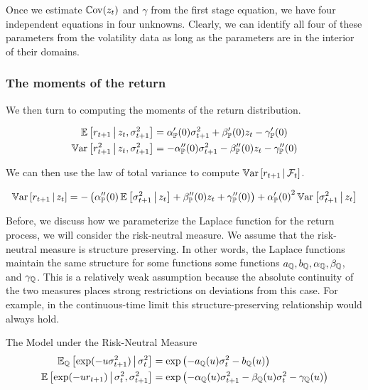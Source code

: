 \documentclass[11pt, letterpaper, twoside, final]{article}
\begin{document}
Once we estimate $\operatorname{\mathbb{C}ov} (z_t)$ and $\gamma$ from the first stage equation, we have four independent equations in
four unknowns.
Clearly, we can identify all four of these parameters from the volatility data as long as the parameters are in
the interior of their domains.

\subsubsection{The moments of the return}

We then turn to computing the moments of the return distribution. 

\begin{align}
    \operatorname{\mathbb{E}}\left[r_{t+1} \,\middle\vert\, z_t, \sigma^2_{t+1}\right]  &= \alpha_{\mathbb{P}}'(0) \sigma^2_{t+1}  + \beta_{\mathbb{P}}'(0)
    z_t - \gamma_{\mathbb{P}}'(0) \\
    \operatorname{\mathbb{V}ar}\left[r_{t+1}^2 \,\middle\vert\, z_t, \sigma^2_{t+1}\right]  &= -\alpha_{\mathbb{P}}''(0) \sigma^2_{t+1}  -
    \beta_{\mathbb{P}}''(0) z_t - \gamma_{\mathbb{P}}''(0)
\end{align}

We can then use the law of total variance to compute $\operatorname{\mathbb{V}ar}\left[r_{t+1} \,\middle\vert\, \mathcal{F}_t\right]$.

\begin{equation}
    \operatorname{\mathbb{V}ar}\left[r_{t+1} \,\middle\vert\, z_t\right]  = -\left( \alpha_{\mathbb{P}}''(0) \operatorname{\mathbb{E}} \left[\sigma^2_{t+1} \,\middle\vert\, z_t \right]
    + \beta_{\mathbb{P}}''(0) z_t + \gamma_{\mathbb{P}}''(0)\right) + {\alpha_{\mathbb{P}}'(0)}^2 \operatorname{\mathbb{V}ar}\left[\sigma^2_{t+1}
    \,\middle\vert\, z_{t} \right]
\end{equation}

Before, we discuss how we parameterize the Laplace function for the return process, we will consider the
risk-neutral measure.
We assume that the risk-neutral measure is structure preserving.
In other words, the Laplace functions maintain the same structure for some functions some functions $a_{\mathbb{Q}},
b_{\mathbb{Q}}, \alpha_{\mathbb{Q}}, \beta_{\mathbb{Q}}$, and $\gamma_{\mathbb{Q}}$.
This is a relatively weak assumption because the absolute continuity of the two measures places strong
restrictions on deviations from this case.
For example, in the continuous-time limit this structure-preserving relationship would always hold.

\begin{defn}{The Model under the Risk-Neutral Measure}
    \label{defn:risk_neutral_model}
    \begin{align}
        \operatorname{\mathbb{E}}_{\mathbb{Q}} \left[\exp(-u \sigma^2_{t+1}) \,\middle\vert\, \sigma^2_t\right] &= \exp\left( - a_{\mathbb{Q}}(u)
            \sigma^2_{t} - b_{\mathbb{Q}}(u) \right) \\
        \operatorname{\mathbb{E}}\left[\exp(-u r_{t+1}) \,\middle\vert\, \sigma^2_{t},  \sigma^2_{t+1}\right] &= \exp\left(- \alpha_{\mathbb{Q}}(u)
        \sigma^2_{t+1} - \beta_{\mathbb{Q}}(u)\sigma^2_{t} - \gamma_{\mathbb{Q}}(u) \right) 
    \end{align}
\end{defn}
\end{document}
